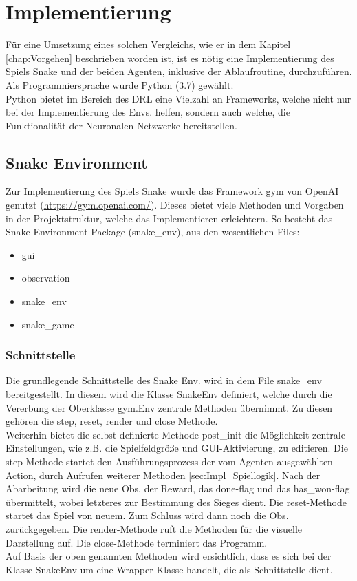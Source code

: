 \chapter{Implementierung}
Für eine Umsetzung eines solchen Vergleichs, wie er in dem Kapitel \ref{chap:Vorgehen} beschrieben worden ist, ist es nötig eine Implementierung des Spiels Snake und der beiden Agenten, inklusive der Ablaufroutine, durchzuführen. Als Programmiersprache wurde Python (3.7) gewählt.\\
Python bietet im Bereich des DRL eine Vielzahl an Frameworks, welche nicht nur bei der Implementierung des Envs. helfen, sondern auch welche, die Funktionalität der Neuronalen Netzwerke bereitstellen.

\section{Snake Environment}
Zur Implementierung des Spiels Snake wurde das Framework gym von OpenAI genutzt (\url{https://gym.openai.com/}). Dieses bietet viele Methoden und Vorgaben in der Projektstruktur, welche das Implementieren erleichtern. So besteht das Snake Environment Package (snake\_env), aus den wesentlichen Files:

\begin{itemize}
	\item gui
	\item observation
	\item snake\_env
	\item snake\_game
\end{itemize}

\subsection{Schnittstelle} \label{sec:Impl_Schnittstelle}
Die grundlegende Schnittstelle des Snake Env. wird in dem File snake\_env bereitgestellt. In diesem wird die Klasse SnakeEnv definiert, welche durch die Vererbung der Oberklasse gym.Env zentrale Methoden übernimmt. Zu diesen gehören die step, reset, render und close Methode.\\
Weiterhin bietet die selbst definierte Methode post\_init die Möglichkeit zentrale Einstellungen, wie z.B. die Spielfeldgröße und GUI-Aktivierung, zu editieren. 
Die step-Methode startet den Ausführungsprozess der vom Agenten ausgewählten Action, durch Aufrufen weiterer Methoden \ref{sec:Impl_Spiellogik}. Nach der Abarbeitung wird die neue Obs, der Reward, das done-flag und das has\_won-flag übermittelt, wobei letzteres zur Bestimmung des Sieges dient.
Die reset-Methode startet das Spiel von neuem. Zum Schluss wird dann noch die Obs. zurückgegeben.
Die render-Methode ruft die Methoden für die visuelle Darstellung auf.
Die close-Methode terminiert das Programm.\\
Auf Basis der oben genannten Methoden wird ersichtlich, dass es sich bei der Klasse SnakeEnv um eine Wrapper-Klasse handelt, die als Schnittstelle dient.

